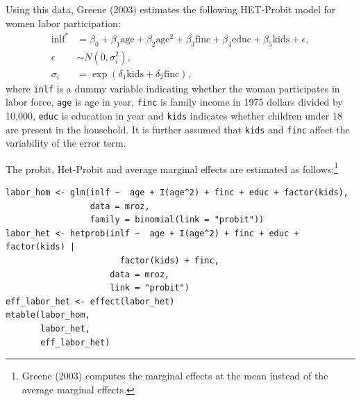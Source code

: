 Using this data, Greene (2003) estimates the following HET-Probit model for women labor participation:
\begin{align}
\text{inlf}^* & = \beta_0 + \beta_1\text{age}+\beta_2\text{age}^2 + \beta_3\text{finc} + \beta_4\text{educ} + \beta_5\text{kids} + \epsilon, \label{eq:lfphet1} \\
\epsilon & \sim N(0, \sigma_i^2), \\
\sigma_i & = \exp(\delta_1 \text{kids} + \delta_2 \text{finc}),
\label{eq:lfphet2}
\end{align}
where \texttt{inlf} is a dummy variable indicating whether the woman participates in labor force, \texttt{age} is age in year, \texttt{finc} is family income in 1975 dollars divided by 10,000, \texttt{educ} is education in year and \texttt{kids} indicates whether children under 18 are present in the household. It is further assumed that \texttt{kids} and \texttt{finc} affect the variability of the error term.

The probit, Het-Probit and average marginal effects are estimated as follows:\footnote{Greene (2003) computes the marginal effects at the mean instead of the average marginal effects.}

\begin{verbatim}
labor_hom <- glm(inlf ~  age + I(age^2) + finc + educ + factor(kids), 
                 data = mroz, 
                 family = binomial(link = "probit"))
labor_het <- hetprob(inlf ~  age + I(age^2) + finc + educ + factor(kids) | 
                       factor(kids) + finc,              
                     data = mroz,                        
                     link = "probit")
eff_labor_het <- effect(labor_het)
mtable(labor_hom,
       labor_het,
       eff_labor_het)
\end{verbatim}

